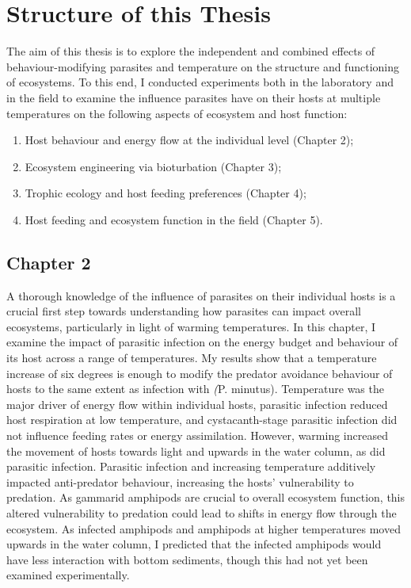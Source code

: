 \section{Structure of this Thesis}

The aim of this thesis is to explore the independent and combined effects of behaviour-modifying parasites and temperature on the structure and functioning of ecosystems. To this end, I conducted experiments both in the laboratory and in the field to examine the influence parasites have on their hosts at multiple temperatures on the following aspects of ecosystem and host function: 

\begin{enumerate}
\item	Host behaviour and energy flow at the individual level (Chapter 2); 
\item	Ecosystem engineering via bioturbation  (Chapter 3); 
\item	Trophic ecology and host feeding preferences  (Chapter 4); 
\item	Host feeding and ecosystem function in the field (Chapter 5).
\end{enumerate}


\subsection{Chapter 2}
A thorough knowledge of the influence of parasites on their individual hosts is a crucial first step towards understanding how parasites can impact overall ecosystems, particularly in light of warming temperatures. In this chapter, I examine the impact of parasitic infection on the energy budget and behaviour of its host across a range of temperatures. My results show that a temperature increase of six degrees is enough to modify the predator avoidance behaviour of hosts to the same extent as infection with \emph(P. minutus). Temperature was the major driver of energy flow within individual hosts, parasitic infection reduced host respiration at low temperature, and cystacanth-stage parasitic infection did not influence feeding rates or energy assimilation. However, warming increased the movement of hosts towards light and upwards in the water column, as did parasitic infection. Parasitic infection and increasing temperature additively impacted anti-predator behaviour, increasing the hosts' vulnerability to predation. As gammarid amphipods are crucial to overall ecosystem function, this altered vulnerability to predation could lead to shifts in energy flow through the ecosystem. As infected amphipods and amphipods at higher temperatures moved upwards in the water column, I predicted that the infected amphipods would have less interaction with bottom sediments, though this had not yet been examined experimentally. 

